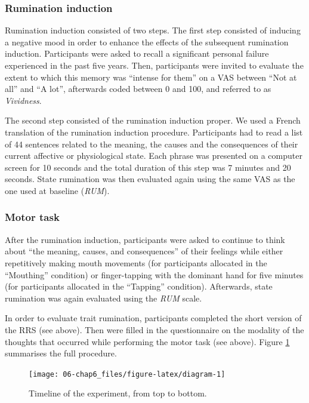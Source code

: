 \documentclass[12pt,]{book}
\begin{document}
\subsubsection{Rumination induction}\label{rumination-induction}

Rumination induction consisted of two steps. The first step consisted of
inducing a negative mood in order to enhance the effects of the
subsequent rumination induction. Participants were asked to recall a
significant personal failure experienced in the past five years. Then,
participants were invited to evaluate the extent to which this memory
was ``intense for them'' on a VAS between ``Not at all'' and ``A lot'',
afterwards coded between 0 and 100, and referred to as \emph{Vividness}.

The second step consisted of the rumination induction proper. We used a
French translation of the \citet{Nolen-hoeksema1993} rumination
induction procedure. Participants had to read a list of 44 sentences
related to the meaning, the causes and the consequences of their current
affective or physiological state. Each phrase was presented on a
computer screen for 10 seconds and the total duration of this step was 7
minutes and 20 seconds. State rumination was then evaluated again using
the same VAS as the one used at baseline (\emph{RUM}).

\subsubsection{Motor task}\label{proc_supp}

After the rumination induction, participants were asked to continue to
think about ``the meaning, causes, and consequences'' of their feelings
while either repetitively making mouth movements (for participants
allocated in the ``Mouthing'' condition) or finger-tapping with the
dominant hand for five minutes (for participants allocated in the
``Tapping'' condition). Afterwards, state rumination was again evaluated
using the \emph{RUM} scale.

In order to evaluate trait rumination, participants completed the short
version of the RRS (see above). Then were filled in the questionnaire on
the modality of the thoughts that occurred while performing the motor
task (see above). Figure \ref{fig:diagram} summarises the full
procedure.

\begin{figure}[H]

{\centering \texttt{[image: 06-chap6\_files/figure-latex/diagram-1]} 

}

\caption{Timeline of the experiment, from top to bottom.}\label{fig:diagram}
\end{figure}
\end{document}
